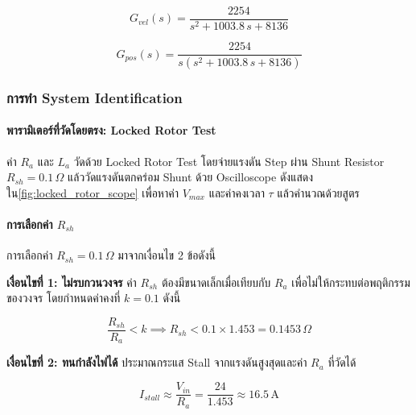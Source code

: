 \begin{equation}
  G_{vel}(s) = \frac{2254}{s^2 + 1003.8\,s + 8136}
  \label{eq:Gvel_num}
\end{equation}

\begin{equation}
  G_{pos}(s) = \frac{2254}{s\left(s^2 + 1003.8\,s + 8136\right)}
  \label{eq:Gpos_num}
\end{equation}

\subsubsection{การทำ System Identification}
\label{subsubsec:system_identification}

\paragraph{พารามิเตอร์ที่วัดโดยตรง: Locked Rotor Test}

ค่า $R_a$ และ $L_a$ วัดด้วย Locked Rotor Test โดยจ่ายแรงดัน Step
ผ่าน Shunt Resistor $R_{sh} = 0.1\,\Omega$ แล้ววัดแรงดันตกคร่อม Shunt
ด้วย Oscilloscope ดังแสดงใน\cref{fig:locked_rotor_scope}
เพื่อหาค่า $V_{max}$ และค่าคงเวลา $\tau$ แล้วคำนวณด้วยสูตร

\paragraph{การเลือกค่า $R_{sh}$}

การเลือกค่า $R_{sh} = 0.1\,\Omega$ มาจากเงื่อนไข 2 ข้อดังนี้

\textbf{เงื่อนไขที่ 1: ไม่รบกวนวงจร}
ค่า $R_{sh}$ ต้องมีขนาดเล็กเมื่อเทียบกับ $R_a$ เพื่อไม่ให้กระทบต่อพฤติกรรมของวงจร
โดยกำหนดค่าคงที่ $k = 0.1$ ดังนี้

\begin{equation}
  \frac{R_{sh}}{R_a} < k \implies R_{sh} < 0.1 \times 1.453 = 0.1453\,\Omega
  \label{eq:rsh_condition1}
\end{equation}

\textbf{เงื่อนไขที่ 2: ทนกำลังไฟได้}
ประมาณกระแส Stall จากแรงดันสูงสุดและค่า $R_a$ ที่วัดได้

\begin{equation}
  I_{stall} \approx \frac{V_{in}}{R_a} = \frac{24}{1.453} \approx 16.5\,\text{A}
  \label{eq:i_stall}
\end{equation}

